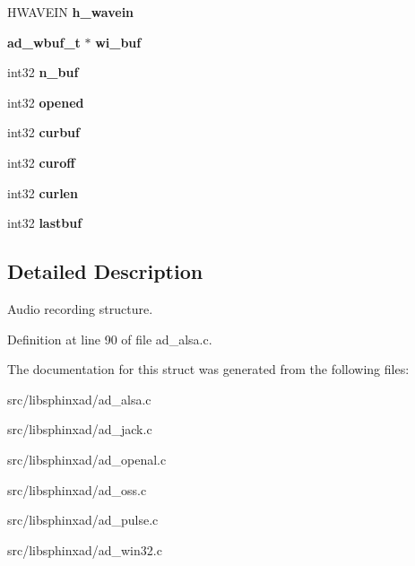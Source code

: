 \begin{DoxyCompactItemize}
H\+W\+A\+V\+E\+IN {\bfseries h\+\_\+wavein}
\item 
\mbox{\label{structad__rec__s_a81d0d2d45fe558b7e7c5504680b15dc5}} 
\textbf{ ad\+\_\+wbuf\+\_\+t} $\ast$ {\bfseries wi\+\_\+buf}
\item 
\mbox{\label{structad__rec__s_acd8fe38386d84c3e954f2652577c0c7e}} 
int32 {\bfseries n\+\_\+buf}
\item 
\mbox{\label{structad__rec__s_a8f1c8d2056486373a7d87c89e995b8f2}} 
int32 {\bfseries opened}
\item 
\mbox{\label{structad__rec__s_a1eb7456dc028152343c8d538195a8aa3}} 
int32 {\bfseries curbuf}
\item 
\mbox{\label{structad__rec__s_a1c7d3d94fc97bb318cbfe4aa33088b62}} 
int32 {\bfseries curoff}
\item 
\mbox{\label{structad__rec__s_ab9d6eff8b29d0741ed3b4133a57174ca}} 
int32 {\bfseries curlen}
\item 
\mbox{\label{structad__rec__s_a30b13811b7b97765861b776e29d5d34c}} 
int32 {\bfseries lastbuf}
\end{DoxyCompactItemize}


\subsection{Detailed Description}
Audio recording structure. 

Definition at line 90 of file ad\+\_\+alsa.\+c.



The documentation for this struct was generated from the following files\+:\begin{DoxyCompactItemize}
\item 
src/libsphinxad/ad\+\_\+alsa.\+c\item 
src/libsphinxad/ad\+\_\+jack.\+c\item 
src/libsphinxad/ad\+\_\+openal.\+c\item 
src/libsphinxad/ad\+\_\+oss.\+c\item 
src/libsphinxad/ad\+\_\+pulse.\+c\item 
src/libsphinxad/ad\+\_\+win32.\+c\end{DoxyCompactItemize}
